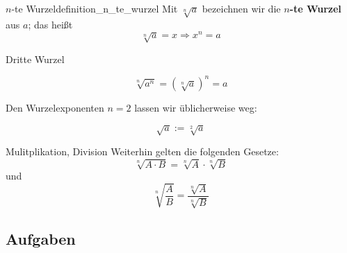


\newpage
\begin{definition}{$n$-te Wurzel}{definition_n_te_wurzel}
Mit $\sqrt[n]{a}$ bezeichnen wir die $n$\textbf{-te Wurzel} aus $a$; das heißt
$$\sqrt[n]{a} = x \Rightarrow x^n = a$$
\end{definition}

\begin{beispiel}{Dritte Wurzel}{}
\end{beispiel}

\begin{gesetz}{}{}
$$\sqrt[n]{a^n} = \left(\sqrt[n]a\right)^n = a$$
\end{gesetz}


\begin{definition}{}{}
Den Wurzelexponenten $n=2$ lassen wir üblicherweise weg:

$$\sqrt{a} := \sqrt[2]{a}$$
\end{definition}

\begin{gesetz}{Mulitplikation, Division}{}
  Weiterhin gelten die folgenden Gesetze:
  $$\sqrt[n]{A\cdot{}B} = \sqrt[n]{A}\cdot{}\sqrt[n]{B}$$ und
  $$\sqrt[n\,]{\frac{A}{B}} = \frac{\sqrt[n]{A}}{\sqrt[n]{B}}$$
\end{gesetz}

\subsection*{Aufgaben}







